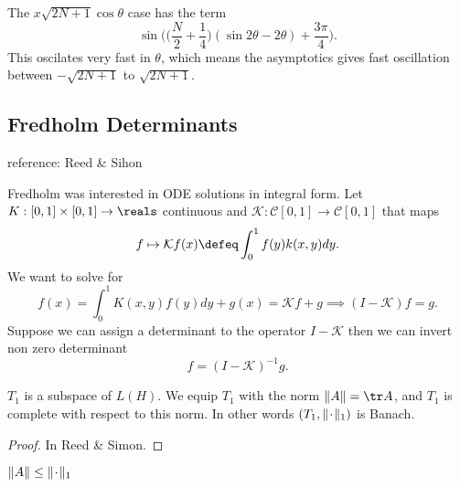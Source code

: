 \begin{remark}
    The $x\sqrt{2N+1}\cos \theta$ case has the term \[
    \sin\Bigg(\Bigg(\frac{N}{2}+\frac{1}{4}\Bigg)(\sin 2\theta - 2\theta)+\frac{3\pi}{4}\Bigg).
    \]
    This oscilates very fast in $\theta$, which means the asymptotics gives fast oscillation between $-\sqrt{2N+1}$ to $\sqrt{2N+1}$.
\end{remark}


\subsection*{Fredholm Determinants}
reference: Reed \& Sihon

Fredholm was interested in ODE solutions in integral form. Let $K:[0,1]\times [0,1] \to \reals$ continuous and $\mathcal{K}: \mathcal{C}[0,1]\to \mathcal{C}[0,1]$ that maps \[
f \mapsto \mathcal{K} f(x) \defeq \int_0^1 f(y) k(x,y)dy.
\]
We want to solve for \[
f(x) = \int_0^1 K(x,y) f(y) dy + g(x) =\mathcal{K}f + g \implies (I-\mathcal{K})f = g.
\]
Suppose we can assign a determinant to the operator $I-\mathcal{K}$ then we can invert non zero determinant \[
f=(I-\mathcal{K})^{-1}g.
\]
\newcommand*{\Z}{\makebox[1ex]{\textbf{$\cdot$}}}%
\begin{alemma}{}{}
    $T_1$ is a subspace of $L(H)$. We equip $T_1$ with the norm $\|A\|=\tr A$, and $T_1$ is complete with respect to this norm. In other words $(T_1,\|\Z\|_1)$ is Banach.
\end{alemma}
\begin{proof}
    In Reed \& Simon.
\end{proof}
\begin{remark}
    $\|A\|\leq \|\Z\|_1$
\end{remark}

